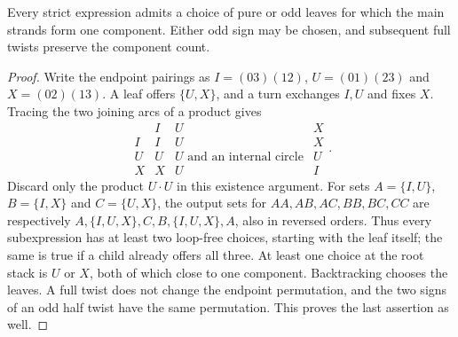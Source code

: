 \begin{proposition}\label{sm:knot-choice}
Every strict expression admits a choice of pure or odd leaves for
which the main strands form one component. Either odd sign may be
chosen, and subsequent full twists preserve the component count.
\end{proposition}
\begin{proof}
Write the endpoint pairings as
$I=(03)(12)$, $U=(01)(23)$ and $X=(02)(13)$.
A leaf offers $\{U,X\}$, and a turn exchanges $I,U$ and fixes $X$.
Tracing the two joining arcs of a product gives
\[
\begin{array}{c|ccc}
 &I&U&X\\\hline
 I&I&U&X\\
 U&U&U\text{ and an internal circle}&U\\
 X&X&U&I
\end{array}.
\]
Discard only the product $U\cdot U$ in this existence argument.
For sets $A=\{I,U\}$, $B=\{I,X\}$ and $C=\{U,X\}$, the output
sets for $AA,AB,AC,BB,BC,CC$ are respectively
$A,\{I,U,X\},C,B,\{I,U,X\},A$, also in reversed orders.
Thus every subexpression has at least two loop-free choices,
starting with the leaf itself; the same is true if a child already
offers all three. At least one choice at the root stack is $U$
or $X$, both of which close to one component. Backtracking chooses
the leaves. A full twist does not change the endpoint permutation,
and the two signs of an odd half twist have the same permutation.
This proves the last assertion as well.
\end{proof}
